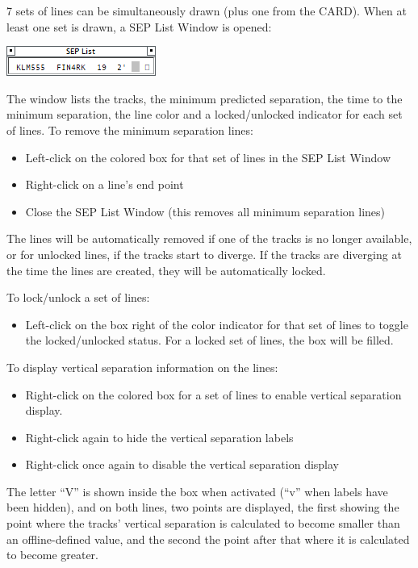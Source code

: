 \documentclass[11pt,a4paper]{memoir}
\begin{document}
7 sets of lines can be simultaneously drawn (plus one from the CARD). When at least one set is drawn, a SEP List Window is opened:

\includegraphics{img/seplist.png}

The window lists the tracks, the minimum predicted separation, the time to the minimum separation, the line color and a locked/unlocked indicator for each set of lines.
To remove the minimum separation lines:

\begin{itemize}
    \item Left-click on the colored box for that set of lines in the SEP List Window
    \item Right-click on a line’s end point
    \item Close the SEP List Window (this removes all minimum separation lines)
\end{itemize}

The lines will be automatically removed if one of the tracks is no longer available, or for unlocked lines, if the tracks start to diverge. If the tracks are diverging at the time the lines are created, they will be automatically locked.

To lock/unlock a set of lines:

\begin{itemize}
    \item Left-click on the box right of the color indicator for that set of lines to toggle the locked/unlocked status. For a locked set of lines, the box will be filled.
\end{itemize}

To display vertical separation information on the lines:

\begin{itemize}
    \item Right-click on the colored box for a set of lines to enable vertical separation display.
    \item Right-click again to hide the vertical separation labels
    \item Right-click once again to disable the vertical separation display
\end{itemize}

The letter “V” is shown inside the box when activated (“v” when labels have been hidden), and on both lines, two points are displayed, the first showing the point where the tracks’ vertical separation is calculated to become smaller than an offline-defined value, and the second the point after that where it is calculated to become greater. 
\end{document}
